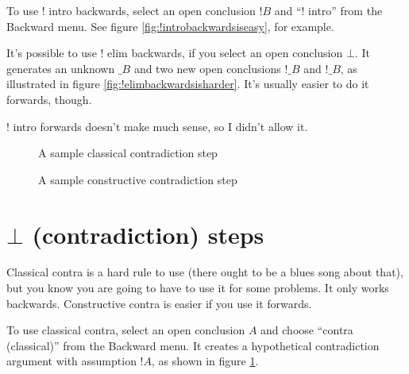 \documentclass[11pt]{book}
\newcommand{\figref}[1]{figure \ref{fig:#1}}
\begin{document}
To use $!$ intro backwards, select an open conclusion $!B$ and ``$!$ intro'' from the Backward menu. See \figref{!introbackwardsiseasy}, for example.

It's possible to use $!$ elim backwards, if you select an open conclusion $\bot$. It generates an unknown $\_B$ and two new open conclusions $!\_B$ and $!\_B$, as illustrated in \figref{!elimbackwardsisharder}. It's usually easier to do it forwards, though.

$!$ intro forwards doesn't make much sense, so I didn't allow it.

\begin{figure}
\centering
{}
\qquad
{}
\caption{A sample classical contradiction step}
\label{fig:classicalcontrastep}
\end{figure}

\begin{figure}
\centering
{}
\qquad
{}
\caption{A sample constructive contradiction step}
\label{fig:constructivecontraforwards}
\end{figure}

\section{$\bot$ (contradiction) steps}

Classical contra is a hard rule to use (there ought to be a blues song about that), but you know you are going to have to use it for some problems. It only works backwards. Constructive contra is easier if you use it forwards.

To use classical contra, select an open conclusion $A$ and choose ``contra (classical)'' from the Backward menu. It creates a hypothetical contradiction argument with assumption $!A$, as shown in \figref{classicalcontrastep}.
\end{document}
